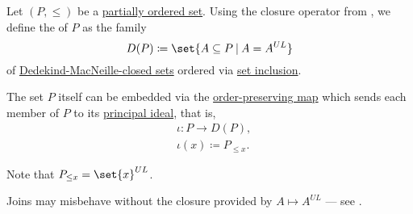 \begin{definition}\label{def:dedekind_macnielle_completion}
  Let \( (P, \leq) \) be a \hyperref[def:partially_ordered_set]{partially ordered set}. Using the closure operator from , we define the  of \( P \) as the family
  \begin{equation*}
    D(P) \coloneqq \set{ A \subseteq P \given A = A^{UL} }
  \end{equation*}
  of \hyperref[def:dedekind_macnielle_closure]{Dedekind-MacNeille-closed sets} ordered via \hyperref[def:subset]{set inclusion}.

  The set \( P \) itself can be embedded via the \hyperref[def:order_function/preserving]{order-preserving map} which sends each member of \( P \) to its \hyperref[def:lattice_ideal/principal]{principal ideal}, that is,
  \begin{equation*}
    \begin{aligned}
      &\iota: P \to D(P), \\
      &\iota(x) \coloneqq P_{\leq x}.
    \end{aligned}
  \end{equation*}
\end{definition}
\begin{comments}
  \item Note that \( P_{\leq x} = \set{ x }^{UL} \).
  \item Joins may misbehave without the closure provided by \( A \mapsto A^{UL} \) --- see .
\end{comments}

